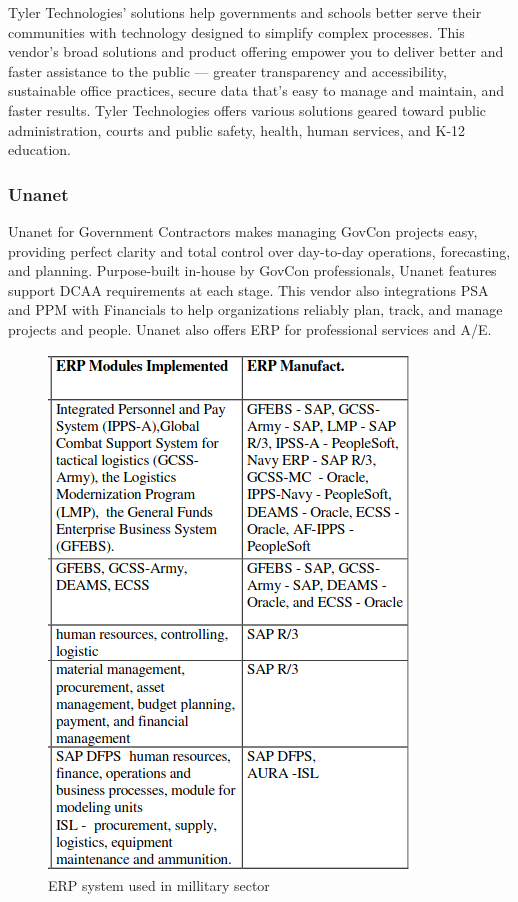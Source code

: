 Tyler Technologies’ solutions help governments and schools better serve their communities with technology designed to simplify complex processes. This vendor’s broad solutions and product offering empower you to deliver better and faster assistance to the public — greater transparency and accessibility, sustainable office practices, secure data that’s easy to manage and maintain, and faster results. Tyler Technologies offers various solutions geared toward public administration, courts and public safety, health, human services, and K-12 education.

\subsubsection*{Unanet}
Unanet for Government Contractors makes managing GovCon projects easy, providing perfect clarity and total control over day-to-day operations, forecasting, and planning. Purpose-built in-house by GovCon professionals, Unanet features support DCAA requirements at each stage. This vendor also integrations PSA and PPM with Financials to help organizations reliably plan, track, and manage projects and people. Unanet also offers ERP for professional services and A/E.

\begin{figure}[H]
\centering
	\includegraphics[scale=0.5]{Chapter1/Figures/ERP3.png}	
	\caption{ERP system used in millitary sector} 
	\label{fig:ERPmillitary}
\end{figure}

